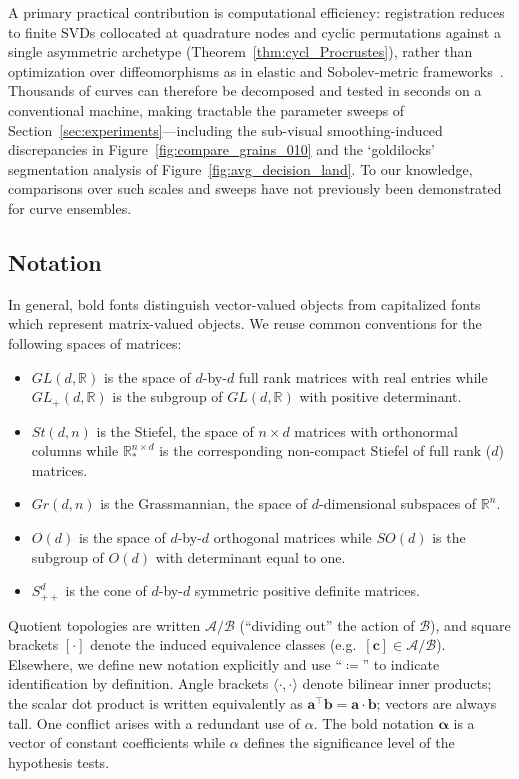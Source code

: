 \documentclass[pdflatex,iicol]{sn-jnl}%
\theoremstyle{thmstyleone}%
\theoremstyle{thmstyletwo}%
\theoremstyle{thmstylethree}%
\begin{document}
A primary practical contribution is computational efficiency: registration reduces to finite SVDs collocated at quadrature nodes and cyclic permutations against a single asymmetric archetype (Theorem~\ref{thm:cycl_Procrustes}), rather than optimization over diffeomorphisms as in elastic and Sobolev-metric frameworks~\cite{srivastava2010shape,bauer2017sobolev,hartman2023varigrad}. Thousands of curves can therefore be decomposed and tested in seconds on a conventional machine, making tractable the parameter sweeps of Section~\ref{sec:experiments}---including the sub-visual smoothing-induced discrepancies in Figure~\ref{fig:compare_grains_010} and the `goldilocks' segmentation analysis of Figure~\ref{fig:avg_decision_land}. To our knowledge, comparisons over such scales and sweeps have not previously been demonstrated for curve ensembles.

\subsection{Notation}
In general, bold fonts distinguish vector-valued objects from capitalized fonts which represent matrix-valued objects. We reuse common conventions for the following spaces of matrices:
\begin{itemize}
    \item $GL(d,\mathbb{R})$ is the space of $d$-by-$d$ full rank matrices with real entries while $GL_+(d,\mathbb{R})$ is the subgroup of $GL(d,\mathbb{R})$ with positive determinant.
    \item $St(d,n)$ is the Stiefel, the space of $n\times d$ matrices with orthonormal columns while $\mathbb{R}^{n \times d}_*$ is the corresponding non-compact Stiefel of full rank ($d$) matrices.
    \item $Gr(d,n)$ is the Grassmannian, the space of $d$-dimensional subspaces of $\mathbb{R}^n$.
    \item $O(d)$ is the space of $d$-by-$d$ orthogonal matrices while $SO(d)$ is the subgroup of $O(d)$ with determinant equal to one.
    \item $S^d_{++}$ is the cone of $d$-by-$d$ symmetric positive definite matrices.
\end{itemize}

Quotient topologies are written $\mathcal{A}/\mathcal{B}$ (``dividing out'' the action of $\mathcal{B}$), and square brackets $[\cdot]$ denote the induced equivalence classes (e.g.\ $[\boldsymbol{c}]\in\mathcal{A}/\mathcal{B}$). Elsewhere, we define new notation explicitly and use ``$\coloneqq$'' to indicate identification by definition. Angle brackets $\langle\cdot,\cdot\rangle$ denote bilinear inner products; the scalar dot product is written equivalently as $\boldsymbol{a}^{\top}\boldsymbol{b}=\boldsymbol{a}\cdot\boldsymbol{b}$; vectors are always tall. One conflict arises with a redundant use of $\alpha$. The bold notation $\boldsymbol{\alpha}$ is a vector of constant coefficients while $\alpha$ defines the significance level of the hypothesis tests.
\end{document}
